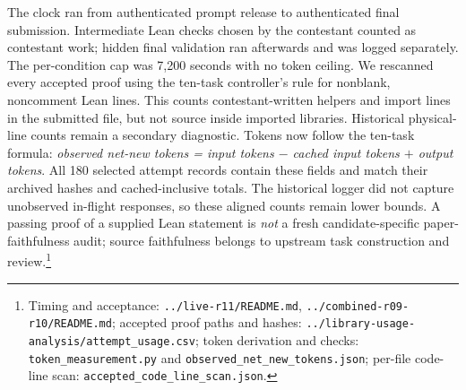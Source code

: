 \documentclass[10pt]{article}
\newcommand{\pathref}[1]{\nolinkurl{#1}}
\begin{document}
The clock ran from authenticated prompt release to authenticated final submission. Intermediate Lean checks chosen by the contestant counted as contestant work; hidden final validation ran afterwards and was logged separately. The per-condition cap was 7,200 seconds with no token ceiling. We rescanned every accepted proof using the ten-task controller's rule for nonblank, noncomment Lean lines. This counts contestant-written helpers and import lines in the submitted file, but not source inside imported libraries. Historical physical-line counts remain a secondary diagnostic. Tokens now follow the ten-task formula: \emph{observed net-new tokens = input tokens $-$ cached input tokens $+$ output tokens}. All 180 selected attempt records contain these fields and match their archived hashes and cached-inclusive totals. The historical logger did not capture unobserved in-flight responses, so these aligned counts remain lower bounds. A passing proof of a supplied Lean statement is \emph{not} a fresh candidate-specific paper-faithfulness audit; source faithfulness belongs to upstream task construction and review.\footnote{Timing and acceptance: \pathref{../live-r11/README.md}, \pathref{../combined-r09-r10/README.md}; accepted proof paths and hashes: \pathref{../library-usage-analysis/attempt_usage.csv}; token derivation and checks: \pathref{token_measurement.py} and \pathref{observed_net_new_tokens.json}; per-file code-line scan: \pathref{accepted_code_line_scan.json}.}
\end{document}
